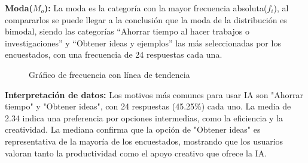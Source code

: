 \vspace{-0.4cm}
\textbf{Moda($M_o$):} La moda es la categoría con la mayor frecuencia absoluta($f_i$), al compararlos se puede llegar a la conclusión que la moda de la distribución es bimodal, siendo las categorías “Ahorrar tiempo al hacer trabajos o investigaciones” y “Obtener ideas y ejemplos” las más seleccionadas por los encuestados, con una frecuencia de 24 respuestas cada una.
\vspace{-0.3cm}
\begin{figure}[H]
	\centering
	\hspace*{-1.5cm}
	\vspace{-0.4cm}
	\caption{Gráfico de frecuencia con línea de tendencia}
\end{figure}
\vspace{-0.5cm}
\textbf{Interpretación de datos:} Los motivos más comunes para usar IA son "Ahorrar tiempo" y "Obtener ideas", con 24 respuestas (45.25\%) cada uno. La media de 2.34 indica una preferencia por opciones intermedias, como la eficiencia y la creatividad. La mediana confirma que la opción de "Obtener ideas" es representativa de la mayoría de los encuestados, mostrando que los usuarios valoran tanto la productividad como el apoyo creativo que ofrece la IA.
